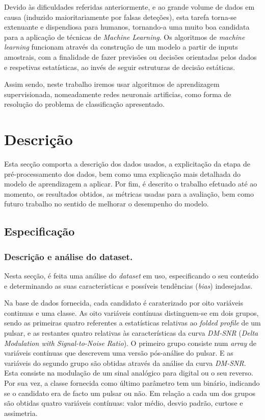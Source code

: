 \documentclass[]{article}
\begin{document}
    Devido às dificuldades referidas anteriormente, e ao grande volume de dados em causa (induzido maioritariamente por falsas deteções), esta tarefa torna-se extenuante e dispendiosa para humanos, tornando-a uma muito boa candidata para a aplicação de técnicas de \textit{Machine Learning}.
    Os algoritmos de \textit{machine learning} funcionam através da construção de um modelo a partir de inputs amostrais, com a finalidade de fazer previsões ou decisões orientadas pelos dados e respetivas estatísticas, ao invés de seguir estruturas de decisão estáticas.
    
    Assim sendo, neste trabalho iremos usar algoritmos de aprendizagem supervisionada, nomeadamente redes neuronais artificias, como forma de resolução do problema de classificação apresentado.\\


\section{Descrição}
	Esta secção comporta a descrição dos dados usados, a explicitação da etapa de pré-processamento dos dados, bem como uma explicação mais detalhada do modelo de aprendizagem a aplicar. Por fim, é descrito o trabalho efetuado até ao momento, os resultados obtidos, as métricas usadas para a avaliação, bem como futuro trabalho no sentido de melhorar o desempenho do modelo.

\subsection{Especificação}

\subsubsection{Descrição e análise do dataset.}
\label{sec:dataset}
	Nesta secção, é feita uma análise do \textit{dataset} em uso, especificando o seu conteúdo e determinando as suas características e possíveis tendências (\textit{bias}) indesejadas.
    
	Na base de dados fornecida, cada candidato é caraterizado por oito variáveis continuas e uma classe. As oito variáveis contínuas distinguem-se em dois grupos, sendo  as primeiras quatro referentes a estatísticas relativas ao \textit{folded profile} de um pulsar, e as restantes quatro relativas às características da curva \textit{DM-SNR} (\textit{Delta Modulation with Signal-to-Noise Ratio}). O primeiro grupo consiste num \textit{array} de variáveis contínuas que descrevem uma versão pós-análise do pulsar. E as variáveis do segundo grupo são obtidas através da análise da curva \textit{DM-SNR}. Esta consiste na modulação de um sinal analógico para digital ou o seu reverso. Por sua vez, a classe fornecida como último parâmetro tem um binário, indicando se o candidato era de facto um pulsar ou não. Em relação a cada um dos grupos são obtidas quatro variáveis contínuas: valor médio, desvio padrão, curtose e assimetria.
\end{document}
